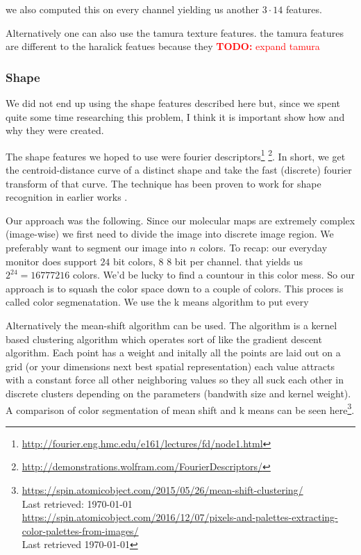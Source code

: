 \documentclass[journal]{vgtc}       %
\newcommand{\todo}[1]{\textcolor{red}{\textbf{TODO:} #1}}
\begin{document}
we also computed this on every channel yielding us another \(3 \cdot 14 \) features.

Alternatively one can also use the tamura texture features. the tamura features are different to the haralick featues because they \todo{expand tamura}

\subsubsection{Shape}
We did not end up using the shape features described here but, since we spent quite some time researching this problem, I think it is important show how and why they were created.

The shape features we hoped to use were  fourier descriptors\footnote{\url{http://fourier.eng.hmc.edu/e161/lectures/fd/node1.html} } \footnote{\url{http://demonstrations.wolfram.com/FourierDescriptors/}}. In short, we get the centroid-distance curve of a distinct shape and take the fast (discrete) fourier transform of that curve. The technique has been proven to work for shape recognition  in earlier works \cite{fourierd}.

Our approach was the following.  Since our molecular maps are extremely complex (image-wise) we first need to divide the image into discrete image region.  We preferably want to segment our image into $n$ colors. To recap: our everyday monitor does support \(24\) bit colors, \(8 \) 8 bit per channel. that yields us \(2^{24}=16777216 \) colors.
We'd be lucky to find a countour in this color mess.
So our approach is to squash the color space down to a couple of colors.
This proces is called color segmenatation. We use the k means algorithm to put every 

Alternatively the mean-shift algorithm can be used. The algorithm is a kernel based clustering algorithm which operates sort of like the gradient descent algorithm.
Each point has a weight and initally all the points are laid out on a grid (or your dimensions next best spatial representation) each value attracts with a constant force all other neighboring values so they all suck each other in discrete clusters depending on the parameters (bandwith size and kernel weight). A comparison of color segmentation of mean shift and  k means can be seen here\footnote{\url{https://spin.atomicobject.com/2015/05/26/mean-shift-clustering/} \\ Last retrieved: \today \\ \url{https://spin.atomicobject.com/2016/12/07/pixels-and-palettes-extracting-color-palettes-from-images/} \\ Last retrieved \today}. 
\end{document}
